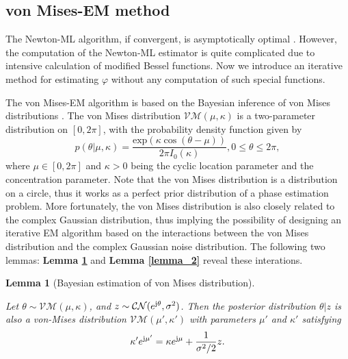 \documentclass[12pt,draftclsnofoot,journal,onecolumn]{IEEEtran}
\newtheorem{lemma}{\bf Lemma}
\theoremstyle{nonumberplain}
\def \exp {\text{exp}}
\def \CN {\mathcal{CN}}
\def \VM {\mathcal{VM}}
\begin{document}
\subsection{von Mises-EM method}    \label{von Mises-EM method}
    The Newton-ML algorithm, if convergent, is asymptotically optimal \cite{casella2021statistical}. 
    However, the computation of the Newton-ML estimator is quite complicated due to intensive calculation of modified Bessel functions. 
    Now we introduce an iterative method for estimating $\varphi$ without any computation of such special functions.

    The von Mises-EM algorithm is based on the Bayesian inference of von Mises distributions \cite{mardia1976bayesian}. The von Mises distribution $\VM(\mu, \kappa)$ is a two-parameter distribution on $[0, 2\pi]$, with the probability density function given by 
    \begin{equation}
        p(\theta|\mu, \kappa) = \frac{\exp(\kappa \cos(\theta - \mu))}{2\pi I_0(\kappa)}, 0\leq \theta \leq 2\pi,
    \end{equation}
    where $\mu \in [0,2\pi]$ and $\kappa >0$ being the cyclic location parameter and the concentration parameter. Note that the von Mises distribution is a distribution on a circle, thus it works as a perfect prior distribution of a phase estimation problem. More fortunately, the von Mises distribution is also closely related to the complex Gaussian distribution, thus implying the possibility of designing an iterative EM algorithm \cite{casella2021statistical} based on the interactions between the von Mises distribution and the complex Gaussian noise distribution. The following two lemmas: {\bf Lemma \ref{lemma_1}} and {\bf Lemma \ref{lemma_2}} reveal these interations. 
    \begin{lemma}[Bayesian estimation of von Mises distribution]\label{lemma_1} \mbox{}\par
        Let $\theta \sim \VM(\mu, \kappa)$, and $z \sim \CN(e^{{\rm j}\theta}, \sigma^2)$. Then the posterior distribution $\theta | z$ is also a von-Mises distribution $\VM(\mu', \kappa')$ with parameters $\mu'$ and $\kappa'$ satisfying
        \begin{equation}
            \kappa' e^{{\rm j}\mu'} = \kappa e^{{\rm j}\mu} + \frac{1}{\sigma^2/2}z.
        \end{equation}
    \end{lemma}
\end{document}
